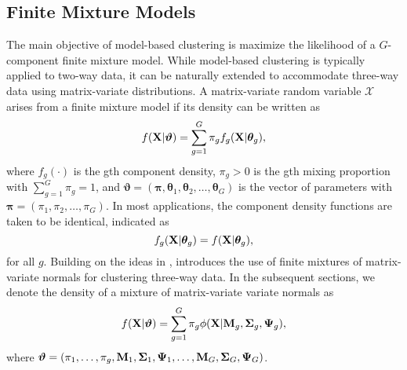 \documentclass[12pt]{report}
\begin{document}
\subsection{Finite Mixture Models}
The main objective of model-based clustering is maximize the likelihood of a $G$-component finite mixture model. While model-based clustering is typically applied to two-way data, it can be naturally extended to accommodate three-way data using matrix-variate distributions. A matrix-variate random variable $\mathscr{X}$ arises from a finite mixture model if its density can be written as
\begin{equation*}
f({\bf X} | \bm{\vartheta}) = \sum_{g=1}^G \pi_g f_g({\bf X} | \bm{\theta}_g),
\end{equation*}
where $f_g(\cdot)$ is the gth component density, $\pi_g >0$ is the gth mixing proportion with $\sum_{g=1}^G\pi_g = 1$, and $\bm{\vartheta} = (\bm{\pi}, \bm{\theta}_1, \bm{\theta}_2, \dots, \bm{\theta}_G)$ is the vector of parameters with $\bm{\pi} = (\pi_1, \pi_2, \dots, \pi_G)$. In most applications, the component density functions are taken to be identical, indicated as $$f_g({\bf X} | \bm{\theta}_g) = f({\bf X} | \bm{\theta}_g),$$ for all $g$. Building on the ideas in \citet{wolfe1965}, \citet{viroli2011} introduces the use of finite mixtures of matrix-variate normals for clustering three-way data. In the subsequent sections, we denote the density of a mixture of matrix-variate variate normals as
\begin{equation*}f({\bf X} | \bm{\vartheta}) = \sum_{g=1}^G \pi_g \phi({\bf X} | {\bf M}_g, {\bf \Sigma}_g, {\bf \Psi}_g),\end{equation*}
where $\bm{\vartheta} = (\pi_1, \dots, \pi_g, {\bf M}_1, {\bf \Sigma}_1, {\bf \Psi}_1, \dots, {\bf M}_G, {\bf \Sigma}_G, {\bf \Psi}_G)$.




\end{document}
